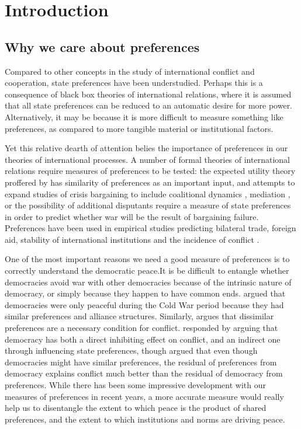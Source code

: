 \setcounter{section}{1}

\section{Introduction}

\subsection{Why we care about preferences}

Compared to other concepts in the study of international conflict and cooperation, state preferences have been understudied. Perhaps this is a consequence of black box theories of international relations, where it is assumed that all state preferences can be reduced to an automatic desire for more power. Alternatively, it may be because it is more difficult to measure something like preferences, as compared to more tangible material or institutional factors.

Yet this relative dearth of attention belies the importance of preferences in our theories of international processes. A number of formal theories of international relations require measures of preferences to be tested: the expected utility theory proffered by \citep{buenodemesquita:1983} has similarity of preferences as an important input, and attempts to expand studies of crisis bargaining to include coalitional dynamics \citep{wolford:2014}, mediation \citep{kydd:2003}, or the possibility of additional disputants \citep{gallop:2017} require a measure of state preferences in order to predict whether war will be the result of bargaining failure. Preferences have been used in empirical studies predicting bilateral trade, foreign aid, stability of international institutions and the incidence of conflict \citep{kastner:2007, derouen:heo:2004, stone:2004, gartzke:2007, braumoeller:2008}. 

One of the most important reasons we need a good measure of preferences is to correctly understand the democratic peace.It is be difficult to entangle whether democracies avoid war with other democracies because of the intrinsic nature of democracy, or simply because they happen to have common ends. \citet{farber:gowa:1995} argued that democracies were only peaceful during the Cold War period because they had similar preferences and alliance structures. Similarly, \citet{gartzke:1998} argues that dissimilar preferences are a necessary condition for conflict. \citet{oneal:russett:1999e} responded by arguing that democracy has both a direct inhibiting effect on conflict, and an indirect one through influencing state preferences, though \citet{gartzke:2000} argued that even though democracies might have similar preferences, the residual of preferences from democracy explains conflict much better than the residual of democracy from preferences. While there has been some impressive development with our measures of preferences in recent years, a more accurate measure would really help us to disentangle the extent to which peace is the product of shared preferences, and the extent to which institutions and norms are driving peace.

